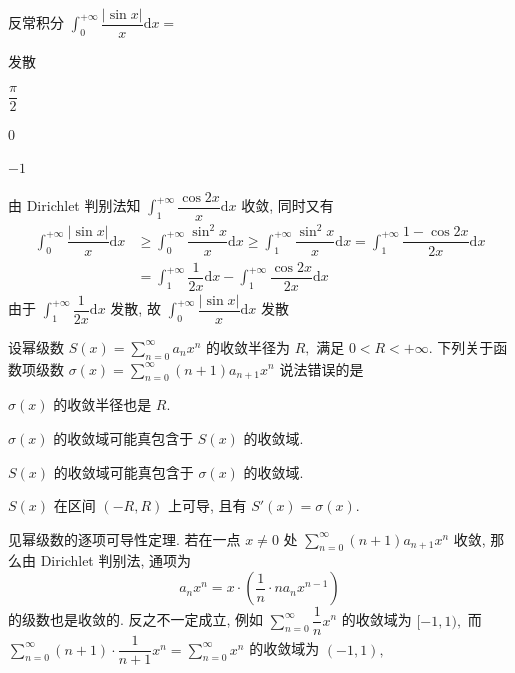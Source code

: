\begin{question}
反常积分 $\int_0^{+\infty} \dfrac{\lvert \sin x \rvert}{x} \mathrm{d} x =$ \paren[A]

\begin{choices}
\item 发散
\item $\dfrac{\pi}{2}$
\item $0$
\item $-1$
\end{choices}
\end{question}

\begin{solution}
由 Dirichlet 判别法知 $\int_1^{+\infty} \dfrac{\cos 2x}{x} \mathrm{d} x$ 收敛, 同时又有
\begin{align*}
\int_0^{+\infty} \dfrac{\lvert \sin x \rvert}{x} \mathrm{d} x & \geqslant \int_0^{+\infty} \dfrac{\sin^2 x}{x} \mathrm{d} x \geqslant \int_1^{+\infty} \dfrac{\sin^2 x}{x} \mathrm{d} x = \int_1^{+\infty} \dfrac{1 - \cos 2x}{2x} \mathrm{d} x \\
& = \int_1^{+\infty} \dfrac{1}{2x} \mathrm{d} x - \int_1^{+\infty} \dfrac{\cos 2x}{2x} \mathrm{d} x
\end{align*}
由于 $\int_1^{+\infty} \dfrac{1}{2x} \mathrm{d} x$ 发散, 故 $\int_0^{+\infty} \dfrac{\lvert \sin x \rvert}{x} \mathrm{d} x$ 发散
\end{solution}

\begin{question}
设幂级数 $S(x) = \sum\limits_{n=0}^\infty a_n x^n$ 的收敛半径为 $R,$ 满足 $0 < R < +\infty.$ 下列关于函数项级数 $\sigma (x) = \sum\limits_{n=0}^\infty (n + 1) a_{n+1} x^n$ 说法错误的是 \paren[C]

\begin{choices}
\item $\sigma (x)$ 的收敛半径也是 $R.$
\item $\sigma (x)$ 的收敛域可能真包含于 $S (x)$ 的收敛域.
\item $S (x)$ 的收敛域可能真包含于 $\sigma (x)$ 的收敛域.
\item $S(x)$ 在区间 $(-R, R)$ 上可导, 且有 $S'(x) = \sigma (x).$
\end{choices}
\end{question}

\begin{solution}
见幂级数的逐项可导性定理. 若在一点 $x \neq 0$ 处 $\sum\limits_{n=0}^\infty (n + 1) a_{n+1} x^n$ 收敛, 那么由 Dirichlet 判别法, 通项为
\[a_n x^n = x\cdot \left(\dfrac{1}{n} \cdot n a_n x^{n-1}\right)\]
的级数也是收敛的. 反之不一定成立, 例如 $\sum\limits_{n=0}^\infty \dfrac{1}{n} x^n$ 的收敛域为 $[-1, 1),$ 而 $\sum\limits_{n=0}^\infty (n+1) \cdot \dfrac{1}{n+1} x^n = \sum\limits_{n=0}^\infty x^n$ 的收敛域为 $(-1, 1),$
\end{solution}

